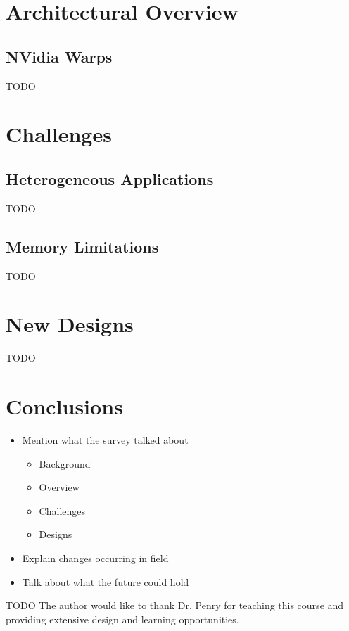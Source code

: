 \documentclass[prodmode,acmtecs]{acmsmall} %
\begin{document}
\section{Architectural Overview}
\subsection{NVidia Warps}
TODO

\section{Challenges}
\subsection{Heterogeneous Applications}
TODO
\subsection{Memory Limitations}
TODO

\section{New Designs}
TODO

\section{Conclusions}
\begin{itemize}
\item Mention what the survey talked about
  \begin{itemize}
  \item Background
  \item Overview
  \item Challenges
  \item Designs
  \end{itemize}
\item Explain changes occurring in field
\item Talk about what the future could hold
\end{itemize}

\begin{acks}
TODO The author would like to thank Dr. Penry for teaching this course and providing extensive design and learning opportunities.
\end{acks}

% 
% 

\end{document}
